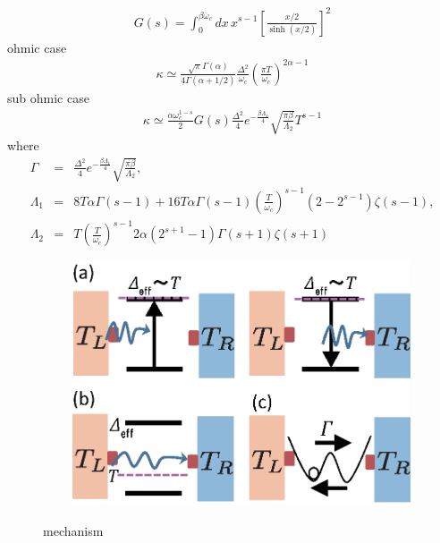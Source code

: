 \begin{eqnarray}
	G(s)=\int_{0}^{\beta \omega_c}dx\, x^{s-1}\left[\frac{x/2}{\sinh{(x/2)}}\right]^{2}
\end{eqnarray}
ohmic case
\begin{eqnarray}
	\kappa\simeq\frac{\sqrt{\pi}\Gamma(\alpha)}{4\Gamma(\alpha+1/2)}\frac{\Delta^2}{\omega_c}	\left(\frac{\pi T}{\omega_c}\right)^{2\alpha-1}
\end{eqnarray}
sub ohmic case
\begin{eqnarray}
	\kappa\simeq\frac{\alpha\omega_c^{1-s}}{2}G(s)\frac{\Delta^2}{4}e^{-\frac{\beta \Lambda_1}{4}}\sqrt{\frac{\pi \beta}{\Lambda_2}}T^{s-1} 
\end{eqnarray}
where
\begin{eqnarray}
	\Gamma&=&\frac{\Delta^2}{4}e^{-\frac{\beta \Lambda_1}{4}}\sqrt{\frac{\pi \beta}{\Lambda_2}},\\
	 \Lambda_1&=&8T\alpha\Gamma(s-1)+16T\alpha\Gamma(s-1)\left(\frac{T}{\omega_c}\right)^{s-1}(2-2^{s-1})\zeta(s-1),\\
	 \Lambda_2 &=&T\left(\frac{T}{\omega_c}\right)^{s-1}2\alpha(2^{s+1}-1)\Gamma(s+1)\zeta(s+1)
 \end{eqnarray}
\begin{figure}[tb]
　\centering
　\includegraphics[width=100mm]{mechanism.eps}
　\caption{mechanism}
\end{figure}